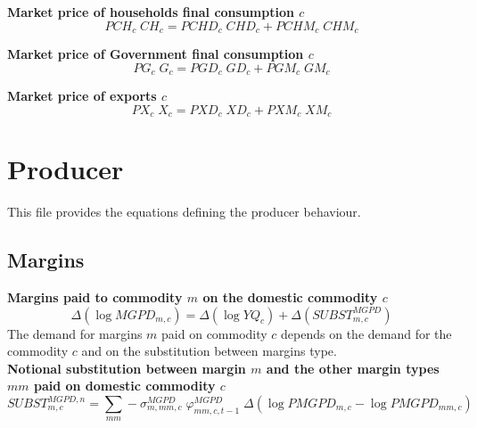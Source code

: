 \documentclass[12pt]{article}
\numberwithin{equation}{section}
\begin{document}
\noindent \textbf{Market price of households final consumption $c$} 
\begin{dmath}
PCH_{c} \; CH_{c} = PCHD_{c} \; CHD_{c} + PCHM_{c} \; CHM_{c}
\label{prices.mdlPCH[c]}
\end{dmath}

\noindent \textbf{Market price of Government final consumption $c$} 
\begin{dmath}
PG_{c} \; G_{c} = PGD_{c} \; GD_{c} + PGM_{c} \; GM_{c}
\label{prices.mdlPG[c]}
\end{dmath}

\noindent \textbf{Market price of exports $c$} 
\begin{dmath}
PX_{c} \; X_{c} = PXD_{c} \; XD_{c} + PXM_{c} \; XM_{c}
\label{prices.mdlPX[c]}
\end{dmath}


\section{Producer}



This file provides the equations defining the producer behaviour.





\subsection{Margins}



\noindent \textbf{Margins paid to commodity $m$ on the domestic commodity $c$} 
\begin{dmath}
\varDelta \left(\operatorname{log} MGPD_{m, c}\right) = \varDelta \left(\operatorname{log} YQ_{c}\right) + \varDelta \left(SUBST^{MGPD}_{m, c}\right)
\label{producer.mdlMGPD[m, c]}
\end{dmath}
The demand for margins $m$ paid on commodity $c$ depends on the demand for the commodity $c$ and on the substitution between margins type. \\

\noindent \textbf{Notional substitution between margin $m$ and the other margin types $mm$ paid on domestic commodity $c$} 
\begin{dmath}
SUBST^{MGPD,n}_{m, c} = \sum_{mm} -\sigma^{MGPD}_{m, mm, c} \; \varphi^{MGPD}_{mm, c, t-1} \; \varDelta \left(\operatorname{log} PMGPD_{m, c} - \operatorname{log} PMGPD_{mm, c}\right)
\label{producer.mdlSUBST_MGPD_n[m, c]}
\end{dmath}
\end{document}
